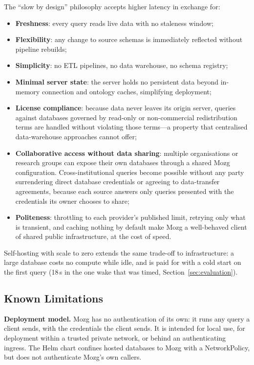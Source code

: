 \documentclass[sigconf,nonacm]{acmart}
\begin{document}
The ``slow by design'' philosophy accepts higher latency in exchange
for:
\begin{itemize}
  \item \textbf{Freshness}: every query reads live data with no
        staleness window;
  \item \textbf{Flexibility}: any change to source schemas is
        immediately reflected without pipeline rebuilds;
  \item \textbf{Simplicity}: no ETL pipelines, no data warehouse,
        no schema registry;
  \item \textbf{Minimal server state}: the server holds no persistent
        data beyond in-memory connection and ontology caches,
        simplifying deployment;
  \item \textbf{License compliance}: because data never leaves its
        origin server, queries against databases governed by read-only
        or non-commercial redistribution terms are handled without
        violating those terms---a property that centralised
        data-warehouse approaches cannot offer;
  \item \textbf{Collaborative access without data sharing}: multiple
        organisations or research groups can expose their own databases
        through a shared Mozg configuration.  Cross-institutional
        queries become possible without any party surrendering direct
        database credentials or agreeing to data-transfer agreements,
        because each source answers only queries presented with the
        credentials its owner chooses to share;
  \item \textbf{Politeness}: throttling to each provider's published
        limit, retrying only what is transient, and caching nothing by
        default make Mozg a well-behaved client of shared public
        infrastructure, at the cost of speed.
\end{itemize}
Self-hosting with scale to zero extends the same trade-off to
infrastructure: a large database costs no compute while idle, and is
paid for with a cold start on the first query (18\,s in the one wake
that was timed, Section~\ref{sec:evaluation}).

\subsection{Known Limitations}
\label{sec:limitations}

\textbf{Deployment model.}  Mozg has no authentication of its own: it
runs any query a client sends, with the credentials the client sends.
It is intended for local use, for deployment within a trusted private
network, or behind an authenticating ingress.  The Helm chart confines
hosted databases to Mozg with a NetworkPolicy, but does not
authenticate Mozg's own callers.
\end{document}
